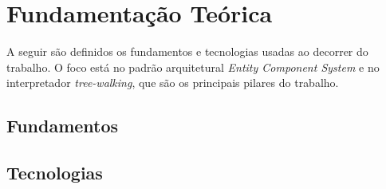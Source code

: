 \chapter{Fundamentação Teórica}\label{ch:fundamentacao}

A seguir são definidos os fundamentos e tecnologias usadas ao decorrer do trabalho. O foco está no padrão arquitetural \textit{Entity Component System} e no interpretador \textit{tree-walking}, que são os principais pilares do trabalho.

\section{Fundamentos}













\section{Tecnologias}



% 


